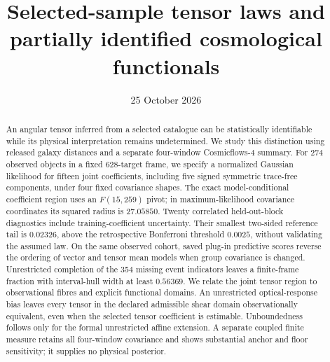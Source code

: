 \documentclass[aps,prd,onecolumn,nofootinbib,superscriptaddress,longbibliography,floatfix]{revtex4-2}
\begin{document}
\title{Selected-sample tensor laws and partially identified cosmological functionals}
\date{25 October 2026}
\begin{abstract}
An angular tensor inferred from a selected catalogue can be statistically identifiable while its physical interpretation remains undetermined. We study this distinction using released galaxy distances and a separate four-window Cosmicflows-4 summary. For 274 observed objects in a fixed 628-target frame, we specify a normalized Gaussian likelihood for fifteen joint coefficients, including five signed symmetric trace-free components, under four fixed covariance shapes. The exact model-conditional coefficient region uses an $F(15,259)$ pivot; in maximum-likelihood covariance coordinates its squared radius is $27.05850$. Twenty correlated held-out-block diagnostics include training-coefficient uncertainty. Their smallest two-sided reference tail is $0.02326$, above the retrospective Bonferroni threshold $0.0025$, without validating the assumed law. On the same observed cohort, saved plug-in predictive scores reverse the ordering of vector and tensor mean models when group covariance is changed. Unrestricted completion of the 354 missing event indicators leaves a finite-frame fraction with interval-hull width at least $0.56369$. We relate the joint tensor region to observational fibres and explicit functional domains. An unrestricted optical-response bias leaves every tensor in the declared admissible shear domain observationally equivalent, even when the selected tensor coefficient is estimable. Unboundedness follows only for the formal unrestricted affine extension. A separate coupled finite measure retains all four-window covariance and shows substantial anchor and floor sensitivity; it supplies no physical posterior.
\end{abstract}
\maketitle






\appendix



\end{document}
